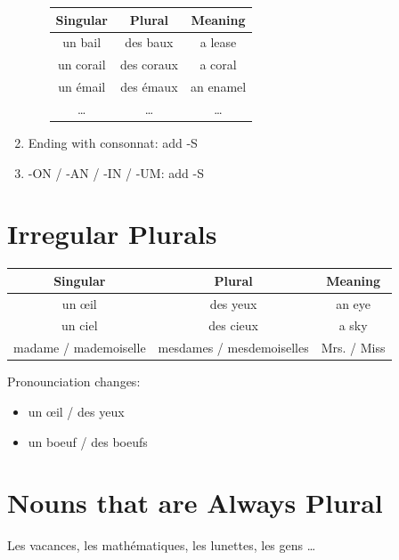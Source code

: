 \documentclass{book}
\begin{document}
\begin{enumerate}
\begin{enumerate}
\begin{center}
\begin{tabular}{|c|c|c|}
                        \hline
                        \textbf{Singular} & \textbf{Plural} & \textbf{Meaning}\\
                        \hline
                        un bail & des baux & a lease\\
                        \hline
                        un corail & des coraux & a coral\\
                        \hline
                        un émail & des émaux & an enamel\\
                        \hline
                        \dots & \dots & \dots\\
                        \hline
                    \end{tabular}
                \end{center}
            \end{enumerate}
            \item Ending with consonnat: add -S
            \item -ON / -AN / -IN / -UM: add -S
        \end{enumerate}
    
    \section{Irregular Plurals}
        \begin{center}
            \begin{tabular}{|c|c|c|}
                \hline
                \textbf{Singular} & \textbf{Plural} & \textbf{Meaning}\\
                \hline
                un œil & des yeux & an eye\\
                \hline
                un ciel & des cieux & a sky\\
                \hline
                madame / mademoiselle & mesdames / mesdemoiselles & Mrs. / Miss\\
                \hline
            \end{tabular}
        \end{center}
        Pronounciation changes:
        \begin{itemize}
            \item un œil / des yeux
            \item un boeuf / des boeufs 
        \end{itemize}
    
    \section{Nouns that are Always Plural}
        Les vacances, les mathématiques, les lunettes, les gens \dots
    
\end{document}
